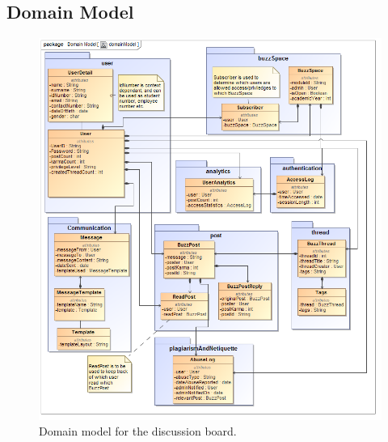 \documentclass [a4paper,12pt] {article}
\begin{document}
	\subsection{Domain Model}
		\begin{figure}[H]
			\centering
			\includegraphics[width=1.0\textwidth]{domainModel.png}
			\caption{Domain model for the discussion board.}
		\end{figure}
\end{document}
